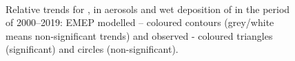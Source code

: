 \begin{figure} [h]
  \\
\caption{Relative trends for \soii, \soiv in aerosols and wet deposition of \soiv in the period of 2000--2019: EMEP modelled -- coloured contours (grey/white means non-significant trends) and observed - coloured triangles (significant) and circles (non-significant).}
\label{fig:Strends_map}
\end{figure}



